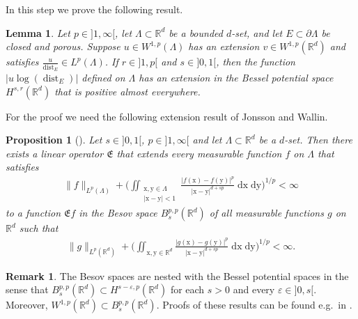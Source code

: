 \documentclass[10pt,leqno]{amsart}
\newtheorem{lemma}[theorem]{Lemma}
\newtheorem{proposition}[theorem]{Proposition}
\theoremstyle{definition}
\newtheorem{remark}[theorem]{Remark}
\numberwithin{equation}{section}
\begin{document}
In this step we prove the following result. 

\begin{lemma}
\label{Lem: Logdist lemma}
Let $p \in {]1,\infty[}$, let $\Lambda \subset {{\mathbb R}}^d$ be a bounded $d$-set, and
let $E \subset \partial \Lambda$ be closed and porous. Suppose $u \in
W^{1,p}(\Lambda)$ has an extension $v \in W^{1,p}({{\mathbb R}}^d)$ and satisfies
$\frac{u}{{\operatorname{dist}}_E} \in L^p(\Lambda)$. If $r \in {]1,p[}$ and $s \in {]0,1[}$,
then the function $|u \log({\operatorname{dist}}_E)|$ defined on
$\Lambda$ has an extension in the Bessel potential space $H^{s,r}({{\mathbb R}}^d)$ that
is positive almost everywhere.
\end{lemma}

For the proof we need the following extension result of Jonsson and Wallin. 

\begin{proposition}[{\cite[Thm.~V.1.1]{jons}}]
\label{p-Jonsson-Wallin theorem on dsets}
Let $s \in {]0,1[}$, $p \in {]1,\infty[}$ and let $\Lambda \subset {{\mathbb R}}^d$ be a
$d$-set. Then there exists a linear operator $\mathfrak{E}$ that extends every
measurable function $f$ on $\Lambda$ that satisfies
\begin{align*}
 \|f\|_{L^p(\Lambda)} + \bigg(\iint_{\substack{{{\mathrm x}},{{\mathrm y}} \in
\Lambda \\ |{{\mathrm x}}-{{\mathrm y}}| < 1}}  \frac{|f({{\mathrm x}}) - f({{\mathrm y}})|^p}{|{{\mathrm x}}-{{\mathrm y}}|^{d+sp}} \;
{{\mathrm d}} {{\mathrm x}} \; {{\mathrm d}} {{\mathrm y}} \bigg)^{1/p} < \infty
\end{align*}
to a function $\mathfrak{E} f$ in the Besov space $B_s^{p,p}({{\mathbb R}}^d)$ of all
measurable functions $g$ on ${{\mathbb R}}^d$ such that
\begin{align*}
 \|g\|_{L^p({{\mathbb R}}^d)} + \bigg(\iint_{{{\mathrm x}},{{\mathrm y}} \in {{\mathbb R}}^d}  \frac{|g({{\mathrm x}}) -
g({{\mathrm y}})|^p}{|{{\mathrm x}}-{{\mathrm y}}|^{d+sp}} \;
{{\mathrm d}} {{\mathrm x}} \; {{\mathrm d}} {{\mathrm y}} \bigg)^{1/p} < \infty.
\end{align*}
\end{proposition}

\begin{remark} \label{r-Jonsson-Wallin theorem on dsets}
The Besov spaces are nested with the Bessel potential spaces in the sense that
$B_s^{p,p}({{\mathbb R}}^d) \subset H^{s-{\varepsilon},p}({{\mathbb R}}^d)$ for each $s>0$ and every ${\varepsilon} \in
{]0,s[}$.
Moreover, $W^{1,p}({{\mathbb R}}^d) \subset B_s^{p,p}({{\mathbb R}}^d)$. Proofs of these results
can be found e.g.\ in \cite[Sec.~2.3.2/2.5.1]{triebel}.
\end{remark}
\end{document}

